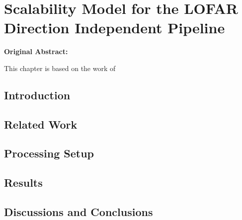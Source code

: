 \chapter{Scalability Model for the LOFAR Direction Independent Pipeline}\label{ch:Scalability_model}





\begin{tcolorbox}[colback=thesislight,colframe=thesismid,width=\dimexpr\textwidth+12mm\relax]
     \textbf{Original Abstract:}


This chapter is based on the work of  
\end{tcolorbox}


\section{\label{sec:ch6_intro}Introduction }


\section{Related Work}\label{sec:ch6_related}


\section{Processing Setup }\label{sec:ch6_methods}



\section{Results}\label{sec:ch6_results}


\section{Discussions and Conclusions}\label{sec:ch6_discussions}



